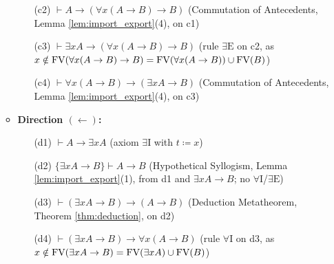 \documentclass[10pt,a4paper]{article}
\begin{document}
\begin{enumerate}
\begin{itemize}
\begin{enumerate}
    \item[(c2)] $\vdash A \to (\forall x (A \to B) \to B)$ \hfill (Commutation of Antecedents, Lemma \ref{lem:import_export}(4), on c1)
    \item[(c3)] $\vdash \exists x A \to (\forall x (A \to B) \to B)$ \hfill (rule $\exists\textrm{E}$ on c2, as $x \notin \FV(\forall x(A \to B) \to B) = \FV(\forall x(A \to B)) \cup \FV(B)$)
    \item[(c4)] $\vdash \forall x (A \to B) \to (\exists x A \to B)$ \hfill (Commutation of Antecedents, Lemma \ref{lem:import_export}(4), on c3)
    \end{enumerate}
  \item \textbf{Direction $(\leftarrow)$:}
    \begin{enumerate}
    \item[(d1)] $\vdash A \to \exists x A$ \hfill (axiom $\exists\textrm{I}$ with $t \coloneqq x$)
    \item[(d2)] $\{\exists x A \to B\} \vdash A \to B$ \hfill (Hypothetical Syllogism, Lemma \ref{lem:import_export}(1), from d1 and $\exists x A \to B$; no $\forall\textrm{I}$/$\exists\textrm{E}$)
    \item[(d3)] $\vdash (\exists x A \to B) \to (A \to B)$ \hfill (Deduction Metatheorem, Theorem \ref{thm:deduction}, on d2)
    \item[(d4)] $\vdash (\exists x A \to B) \to \forall x (A \to B)$ \hfill (rule $\forall\textrm{I}$ on d3, as $x \notin {\textrm{FV}}(\exists x A \to B) = {\textrm{FV}}(\exists x A) \cup {\textrm{FV}}(B)$)
    \end{enumerate}
  \end{itemize}
\end{enumerate}
\myqed
\end{document}
